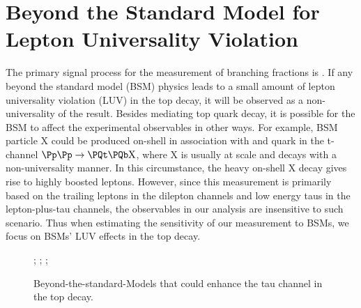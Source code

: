 

\section{Beyond the Standard Model for Lepton Universality Violation}
\label{sec:physics:bsm}

The primary signal process for the measurement of \PW branching fractions is \ttbar. If any beyond the standard model (BSM) physics leads to a small amount of lepton universality violation (LUV) in the top decay, it will be observed as a non-universality of the \BWl result. Besides mediating top quark decay, it is possible for the BSM to affect the experimental observables in other ways. For example, BSM particle \textrm{X} could be produced on-shell in association with \PQt and \PQb quark in the t-channel $\Pp\Pp \to \PQt \PQb \mathrm{X}$, where \textrm{X} is usually at \TeV scale and decays with a non-universality manner. In this circumstance, the heavy on-shell \textrm{X} decay gives rise to highly boosted leptons. However, since this \BWl measurement is primarily based on the trailing leptons in the dilepton channels and low energy taus in the lepton-plus-tau channels, the observables in our analysis are insensitive to such scenario. Thus when estimating the sensitivity of our measurement to BSMs, we focus on BSMs' LUV effects in the top decay. 

\begin{figure}[ht]
    \centering
    ;\qquad
    ;\qquad
    ;
    \caption{Beyond-the-standard-Models that could enhance the tau channel in the top decay. }
   \label{fig:physics:bsm:topdecayBSM}
\end{figure}

